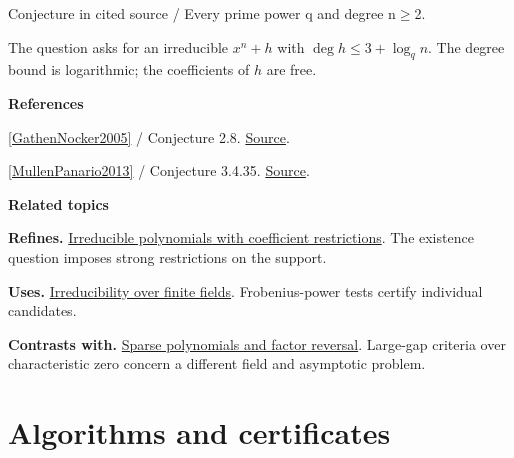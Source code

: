 \documentclass[11pt,a4paper,oneside,openany]{book}
\newenvironment{sources}{\par\smallskip\begingroup\footnotesize\color{atlasgray}\leftskip=10pt\setlength{\parskip}{2pt}}{\par\endgroup\smallskip}
\begin{document}
{\small\sffamily\color{atlasgold}Conjecture in cited source / Every prime power q and degree n\ensuremath{\ge}2.}\par\smallskip
\color{black} The question asks for an irreducible \(x^n+h\) with \(\deg h\le3+\log_q n\). The degree bound is logarithmic; the coefficients of \(h\) are free.\par
\begin{sources}
\textbf{References}\par\smallskip
\noindent\hyperlink{ref:GathenNocker2005}{[GathenNocker2005]} / Conjecture 2.8.  \href{https://vonzurgathen.online/old/files/gatnoc05.pdf}{Source}.\par
\noindent\hyperlink{ref:MullenPanario2013}{[MullenPanario2013]} / Conjecture 3.4.35.  \href{https://doi.org/10.1201/b15006}{Source}.\par
\end{sources}\color{black}
\par\medskip\begingroup\footnotesize\setlength{\parskip}{1pt}\textbf{\sffamily\color{atlasgreen}Related topics}\par
\color{black}\textbf{Refines.} \hyperlink{article:finite-field-constructions}{Irreducible polynomials with coefficient restrictions}. The existence question imposes strong restrictions on the support.\par
\color{black}\textbf{Uses.} \hyperlink{article:finite-field-irreducibility}{Irreducibility over finite fields}. Frobenius-power tests certify individual candidates.\par
\color{black}\textbf{Contrasts with.} \hyperlink{article:sparse-gaps}{Sparse polynomials and factor reversal}. Large-gap criteria over characteristic zero concern a different field and asymptotic problem.\par
\endgroup
\part{Algorithms and certificates}
\end{document}
